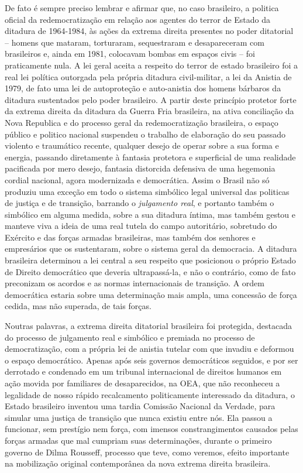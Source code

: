 De fato é sempre preciso lembrar e afirmar que, no caso brasileiro, a
politica oficial da redemocratização em relação aos agentes do terror de
Estado da ditadura de 1964-1984, às ações da extrema direita presentes
no poder ditatorial -- homens que mataram, torturaram, sequestraram e
desapareceram com brasileiros e, ainda em 1981, colocavam bombas em
espaços civis -- foi praticamente nula. A lei geral aceita a respeito do
terror de estado brasileiro foi a real lei política outorgada pela
própria ditadura civil-militar, a lei da Anistia de 1979, de fato uma
lei de autoproteção e auto-anistia dos homens bárbaros da ditadura
sustentados pelo poder brasileiro. A partir deste princípio protetor
forte da extrema direita da ditadura da Guerra Fria brasileira, na ativa
conciliação da Nova Republica e do processo geral da redemocratização
brasileira, o espaço público e politico nacional suspendeu o trabalho de
elaboração do seu passado violento e traumático recente, qualquer desejo
de operar sobre a sua forma e energia, passando diretamente à fantasia
protetora e superficial de uma realidade pacificada por mero desejo,
fantasia distorcida defensiva de uma hegemonia cordial nacional, agora
modernizada e democrática. Assim o Brasil não só produziu uma exceção em
todo o sistema simbólico legal universal das politicas de justiça e de
transição, barrando o \emph{julgamento real}, e portanto também o
simbólico em alguma medida, sobre a sua ditadura íntima, mas também
gestou e manteve viva a ideia de uma real tutela do campo autoritário,
sobretudo do Exército e das forças armadas brasileiras, mas também dos
senhores e empresários que os sustentaram, sobre o sistema geral da
democracia. A ditadura brasileira determinou a lei central a seu
respeito que posicionou o próprio Estado de Direito democrático que
deveria ultrapassá-la, e não o contrário, como de fato preconizam os
acordos e as normas internacionais de transição. A ordem democrática
estaria sobre uma determinação mais ampla, uma concessão de força
cedida, mas não superada, de tais forças.

Noutras palavras, a extrema direita ditatorial brasileira foi protegida,
destacada do processo de julgamento real e simbólico e premiada no
processo de democratização, com a própria lei de anistia tutelar com que
invadiu e deformou o espaço democrático. Apenas após seis governos
democráticos seguidos, e por ser derrotado e condenado em um tribunal
internacional de direitos humanos em ação movida por familiares de
desaparecidos, na OEA, que não reconheceu a legalidade de nosso rápido
recalcamento politicamente interessado da ditadura, o Estado brasileiro
inventou uma tardia Comissão Nacional da Verdade, para simular uma
justiça de transição que nunca existiu entre nós. Ela passou a
funcionar, sem prestígio nem força, com imensos constrangimentos
causados pelas forças armadas que mal cumpriam suas determinações,
durante o primeiro governo de Dilma Rousseff, processo que teve, como
veremos, efeito importante na mobilização original contemporânea da nova
extrema direita brasileira.

